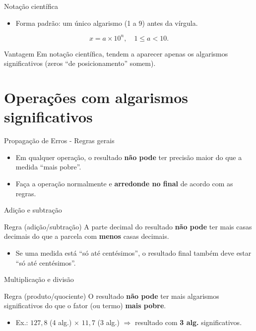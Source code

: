\documentclass[aspectratio=169,10pt]{beamer}
\begin{document}
\begin{frame}{Notação científica}
\begin{itemize}
  \item Forma padrão: um único algarismo (1 a 9) antes da vírgula.
\end{itemize}

\begin{equation}
\label{eq:notacao_cientifica}
x = a \times 10^{n}, \quad 1\le a < 10.
\end{equation}

\begin{block}{Vantagem}
Em notação científica, tendem a aparecer apenas os algarismos significativos (zeros “de posicionamento” somem).
\end{block}
\end{frame}

\section{Operações com algarismos significativos}

\begin{frame}{Propagação de Erros - Regras gerais}
\begin{itemize}
  \item Em qualquer operação, o resultado \textbf{não pode} ter precisão maior do que a medida “mais pobre”.
  \item Faça a operação normalmente e \textbf{arredonde no final} de acordo com as regras.
\end{itemize}
\end{frame}

\begin{frame}{Adição e subtração}
\begin{block}{Regra (adição/subtração)}
A parte decimal do resultado \textbf{não pode} ter mais casas decimais do que a parcela com \textbf{menos} casas decimais.
\end{block}

\begin{itemize}
  \item Se uma medida está “só até centésimos”, o resultado final também deve estar “só até centésimos”.
\end{itemize}
\end{frame}

\begin{frame}{Multiplicação e divisão}
\begin{block}{Regra (produto/quociente)}
O resultado \textbf{não pode} ter mais algarismos significativos do que o fator (ou termo) \textbf{mais pobre}.
\end{block}

\begin{itemize}
  \item Ex.: \(127{,}8\) (4 alg.) \(\times\) \(11{,}7\) (3 alg.) \(\Rightarrow\) resultado com \textbf{3 alg.} significativos.
\end{itemize}
\end{frame}
\end{document}
